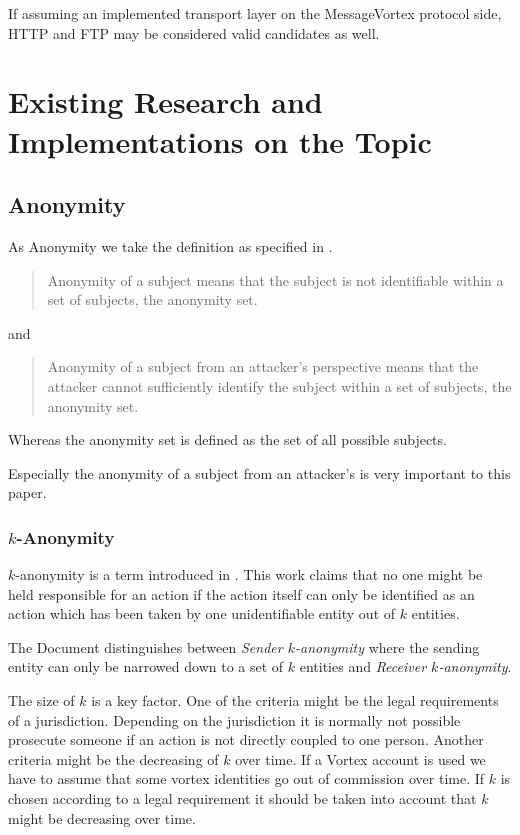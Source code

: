 
If assuming an implemented transport layer on the MessageVortex protocol side, HTTP and FTP may be considered valid candidates as well.


\chapter{Existing Research and Implementations on the Topic \label{sec:existingRD}}
\section{Anonymity}
As Anonymity we take the definition as specified in \cite{anon_terminology}.
\begin{quote}
	Anonymity of a subject means that the subject is not identifiable within a set of subjects, the anonymity set.\omitted
\end{quote}
and
\begin{quote}
	Anonymity of a subject from an attacker's perspective means that the attacker cannot sufficiently identify the subject within a set of subjects, the anonymity set.\omitted
\end{quote}

Whereas the anonymity set is defined as the set of all possible subjects.

Especially the anonymity of a subject from an attacker's is very important to this paper. 

\subsection{$k$-Anonymity}
$k$-anonymity is a term introduced in \cite{k-anonymous:ccs2003}. This work claims that no one might be held responsible for an action if the action itself can only be identified as an action which has been taken by one unidentifiable entity out of $k$ entities.

The Document distinguishes between \textit{Sender $k$-anonymity} where the sending entity can only be narrowed down to a set of $k$ entities and \textit{Receiver $k$-anonymity}. 

The size of $k$ is a key factor. One of the criteria might be the legal requirements of a jurisdiction. Depending on the jurisdiction it is normally not possible prosecute someone if an action is not directly coupled to one person. Another criteria might be the decreasing of $k$ over time. If a Vortex account is used we have to assume that some vortex identities go out of commission over time. If $k$ is chosen according to a legal requirement it should be taken into account that $k$ might be decreasing over time.

